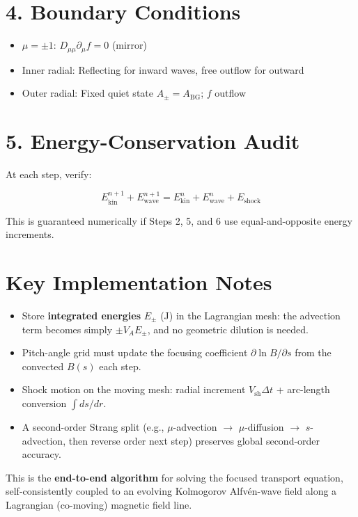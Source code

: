 \section*{4. Boundary Conditions}

\begin{itemize}
\item $\mu = \pm 1$: $D_{\mu\mu} \partial_\mu f = 0$ (mirror)
\item Inner radial: Reflecting for inward waves, free outflow for outward
\item Outer radial: Fixed quiet state $A_\pm = A_{\text{BG}}$; $f$ outflow
\end{itemize}

\section*{5. Energy-Conservation Audit}

At each step, verify:

\[
E_{\text{kin}}^{n+1} + E_{\text{wave}}^{n+1} = 
E_{\text{kin}}^n + E_{\text{wave}}^n + E_{\text{shock}}
\]

This is guaranteed numerically if Steps 2, 5, and 6 use equal-and-opposite energy increments.

\section*{Key Implementation Notes}

\begin{itemize}
\item Store \textbf{integrated energies} $E_\pm$ (J) in the Lagrangian mesh: the advection term becomes simply $\pm V_A E_\pm$, and no geometric dilution is needed.
\item Pitch-angle grid must update the focusing coefficient $\partial \ln B / \partial s$ from the convected $B(s)$ each step.
\item Shock motion on the moving mesh: radial increment $V_{\text{sh}} \Delta t$ + arc-length conversion $\int ds / dr$.
\item A second-order Strang split (e.g., $\mu$-advection $\rightarrow$ $\mu$-diffusion $\rightarrow$ $s$-advection, then reverse order next step) preserves global second-order accuracy.
\end{itemize}

\bigskip

\noindent
This is the \textbf{end-to-end algorithm} for solving the focused transport equation, self-consistently coupled to an evolving Kolmogorov Alfvén-wave field along a Lagrangian (co-moving) magnetic field line.

